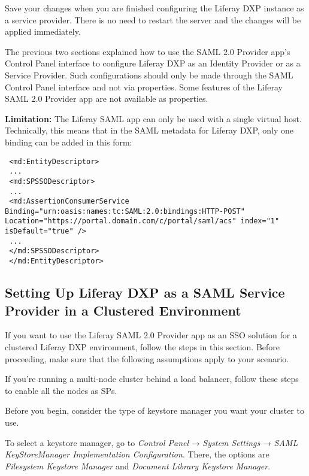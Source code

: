 Save your changes when you are finished configuring the Liferay DXP
instance as a service provider. There is no need to restart the server
and the changes will be applied immediately.

The previous two sections explained how to use the SAML 2.0 Provider
app's Control Panel interface to configure Liferay DXP as an Identity
Provider or as a Service Provider. Such configurations should only be
made through the SAML Control Panel interface and not via properties.
Some features of the Liferay SAML 2.0 Provider app are not available as
properties.

\noindent\hrulefill

\textbf{Limitation:} The Liferay SAML app can only be used with a single
virtual host. Technically, this means that in the SAML metadata for
Liferay DXP, only one binding can be added in this form:

\begin{verbatim}
 <md:EntityDescriptor>
 ...
 <md:SPSSODescriptor>
 ...
 <md:AssertionConsumerService Binding="urn:oasis:names:tc:SAML:2.0:bindings:HTTP-POST" Location="https://portal.domain.com/c/portal/saml/acs" index="1" isDefault="true" />
 ...
 </md:SPSSODescriptor>
 </md:EntityDescriptor>
\end{verbatim}

\noindent\hrulefill

\subsection{Setting Up Liferay DXP as a SAML Service Provider in a
Clustered
Environment}\label{setting-up-liferay-dxp-as-a-saml-service-provider-in-a-clustered-environment}

If you want to use the Liferay SAML 2.0 Provider app as an SSO solution
for a clustered Liferay DXP environment, follow the steps in this
section. Before proceeding, make sure that the following assumptions
apply to your scenario.

If you're running a multi-node cluster behind a load balancer, follow
these steps to enable all the nodes as SPs.

Before you begin, consider the type of keystore manager you want your
cluster to use.

To select a keystore manager, go to \emph{Control Panel} → \emph{System
Settings} → \emph{SAML KeyStoreManager Implementation Configuration}.
There, the options are \emph{Filesystem Keystore Manager} and
\emph{Document Library Keystore Manager}.

